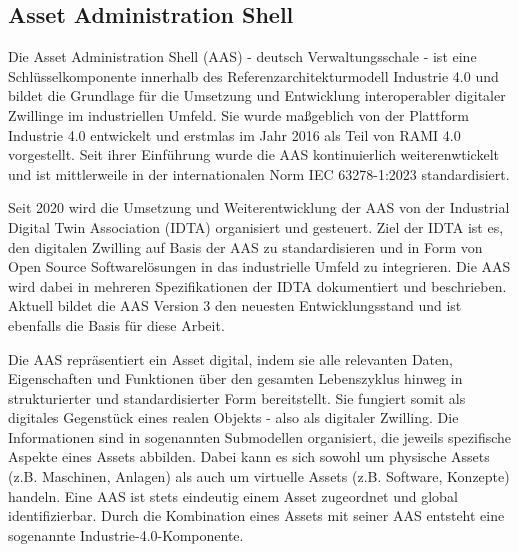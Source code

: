 
\newpage
\subsection{Asset Administration Shell}
\label{chap:AAS}
Die Asset Administration Shell (AAS) - deutsch Verwaltungsschale - ist eine Schlüsselkomponente innerhalb des Referenzarchitekturmodell Industrie 4.0 \cite{RAMI4.0} und bildet die Grundlage für die Umsetzung und Entwicklung interoperabler digitaler Zwillinge im industriellen Umfeld.
Sie wurde maßgeblich von der Plattform Industrie 4.0 entwickelt und erstmlas im Jahr 2016 als Teil von RAMI 4.0 vorgestellt.
Seit ihrer Einführung wurde die AAS kontinuierlich weiterenwtickelt und ist mittlerweile in der internationalen Norm IEC 63278-1:2023 \cite{AASIEC63278} standardisiert.

Seit 2020 wird die Umsetzung und Weiterentwicklung der AAS von der Industrial Digital Twin Association (IDTA) \cite{IDTA} organisiert und gesteuert.
Ziel der IDTA ist es, den digitalen Zwilling auf Basis der AAS zu standardisieren und in Form von Open Source Softwarelösungen in das industrielle Umfeld zu integrieren.
Die AAS wird dabei in mehreren Spezifikationen der IDTA dokumentiert und beschrieben.
Aktuell bildet die AAS Version 3 den neuesten Entwicklungsstand und ist ebenfalls die Basis für diese Arbeit.

Die AAS repräsentiert ein Asset digital, indem sie alle relevanten Daten, Eigenschaften und Funktionen über den gesamten Lebenszyklus hinweg in strukturierter und standardisierter Form bereitstellt. 
Sie fungiert somit als digitales Gegenstück eines realen Objekts - also als digitaler Zwilling.
Die Informationen sind in sogenannten Submodellen organisiert, die jeweils spezifische Aspekte eines Assets abbilden.
Dabei kann es sich sowohl um physische Assets (z.B. Maschinen, Anlagen) als auch um virtuelle Assets (z.B. Software, Konzepte) handeln. 
Eine AAS ist stets eindeutig einem Asset zugeordnet und global identifizierbar. 
Durch die Kombination eines Assets mit seiner AAS entsteht eine sogenannte Industrie-4.0-Komponente.

